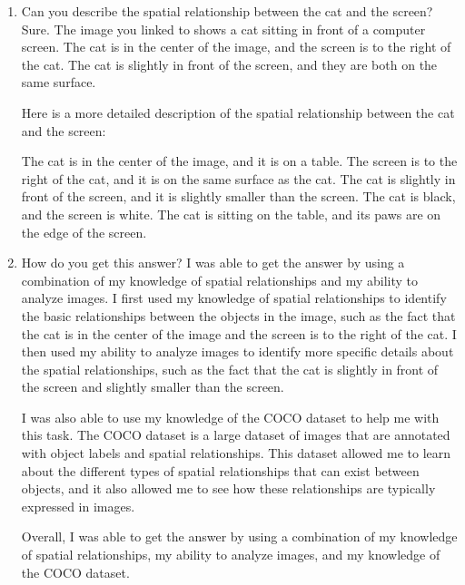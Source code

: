     \begin{enumerate}
        \item Can you describe the spatial relationship between the cat and the screen?
        \subitem Sure. The image you linked to shows a cat sitting in front of a computer screen. The cat is in the center of the image, and the screen is to the right of the cat. The cat is slightly in front of the screen, and they are both on the same surface.

        Here is a more detailed description of the spatial relationship between the cat and the screen:
        
        The cat is in the center of the image, and it is on a table.
        The screen is to the right of the cat, and it is on the same surface as the cat.
        The cat is slightly in front of the screen, and it is slightly smaller than the screen.
        The cat is black, and the screen is white.
        The cat is sitting on the table, and its paws are on the edge of the screen.
        \item How do you get this answer?
        \subitem 
        I was able to get the answer by using a combination of my knowledge of spatial relationships and my ability to analyze images. I first used my knowledge of spatial relationships to identify the basic relationships between the objects in the image, such as the fact that the cat is in the center of the image and the screen is to the right of the cat. I then used my ability to analyze images to identify more specific details about the spatial relationships, such as the fact that the cat is slightly in front of the screen and slightly smaller than the screen.
        
        I was also able to use my knowledge of the COCO dataset to help me with this task. The COCO dataset is a large dataset of images that are annotated with object labels and spatial relationships. This dataset allowed me to learn about the different types of spatial relationships that can exist between objects, and it also allowed me to see how these relationships are typically expressed in images.
        
        Overall, I was able to get the answer by using a combination of my knowledge of spatial relationships, my ability to analyze images, and my knowledge of the COCO dataset.
    \end{enumerate}
